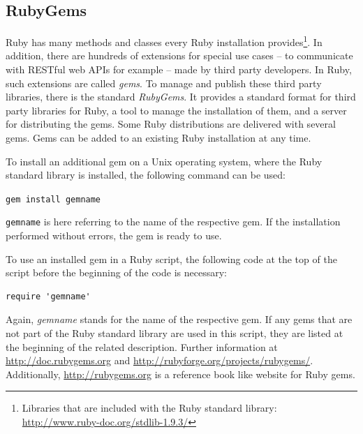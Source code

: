 \subsection{RubyGems}
Ruby has many methods and classes every Ruby installation provides\footnote{Libraries that are included with the Ruby standard library: \url{http://www.ruby-doc.org/stdlib-1.9.3/}}. In addition, there are hundreds of extensions for special use cases – to communicate with RESTful web APIs for example – made by third party developers. In Ruby, such extensions are called \emph{gems}. To manage and publish these third party libraries, there is the standard \emph{RubyGems}. It provides a standard format for third party libraries for Ruby, a tool to manage the installation of them, and a server for distributing the gems. \cite{ruby:gemdev} Some Ruby distributions are delivered with several gems. Gems can be added to an existing Ruby installation at any time.

To install an additional gem on a Unix operating system, where the Ruby standard library is installed, the following command can be used:  
\begin{center}
\texttt{gem install gemname}
\end{center}
\texttt{gemname} is here referring to the name of the respective gem. If the installation performed without errors, the gem is ready to use. \cite{ruby:gemdoc}

To use an installed gem in a Ruby script, the following code at the top of the script before the beginning of the code is necessary:

\begin{lstlisting}[aboveskip=1\baselineskip, caption=Using the gem \emph{gemname}, label=listing001]
require 'gemname'
\end{lstlisting}
Again, \emph{gemname} stands for the name of the respective gem. If any gems that are not part of the Ruby standard library are used in this script, they are listed at the beginning of the related description. Further information at \url{http://doc.rubygems.org} and \url{http://rubyforge.org/projects/rubygems/}. Additionally, \url{http://rubygems.org} is a reference book like website for Ruby gems.

